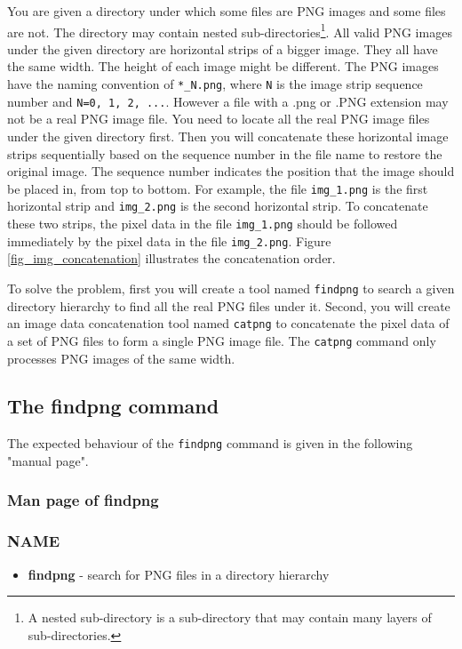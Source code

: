 You are given a directory under which some files are PNG images and some files are not. The directory may contain nested sub-directories\footnote{A nested sub-directory is a sub-directory that may contain many layers of sub-directories.}. All valid PNG images under the given directory are horizontal strips of a bigger image. They all have the same width. The height of each image might be different. The PNG images have the naming convention of \verb+*_N.png+, where \verb+N+ is the image strip sequence number and \verb+N=0, 1, 2, ...+. However a file with a .png or .PNG extension may not be a real PNG image file. You need to locate all the real PNG image files under the given directory first. Then you will concatenate these horizontal image strips sequentially based on the sequence number in the file name to restore the original image. The sequence number indicates the position that the image should be placed in, from top to bottom. For example, the file \verb+img_1.png+ is the first horizontal strip and \verb+img_2.png+ is the second horizontal strip. To concatenate these two strips, the pixel data in the file \verb+img_1.png+ should be followed immediately by the pixel data in the file \verb+img_2.png+. Figure \ref{fig_img_concatenation} illustrates the concatenation order.

To solve the problem, first you will create a tool named \verb+findpng+ to search a given directory hierarchy to find all the real PNG files under it. Second, you will create an image data concatenation tool named \verb+catpng+ to concatenate the pixel data of a set of PNG files to form a single PNG image file. The \verb+catpng+ command only processes PNG images of the same width.
\subsection{The findpng command}
The expected behaviour of the \verb+findpng+ command is given in the following "manual page".
\subsubsection{Man page of findpng}
\subsubsection*{NAME}
\begin{itemize}
	\item[]{\bf findpng} - search for PNG files in a directory hierarchy
\end{itemize}
